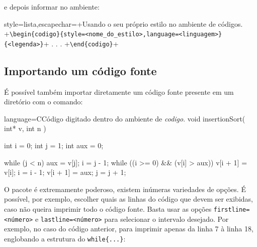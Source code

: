 \begin{center}
\colorbox{black!8}{\ttfamily{}\hspace{\linewidth}\hspace{-2\fboxsep}}
\end{center}

\noindent
e depois informar no ambiente: 

\begin{codigo}{style=lista,escapechar=+}{Usando o seu próprio estilo no ambiente de códigos.}
+\verb!\begin{codigo}{style=<nome_do_estilo>,language=<linguagem>}{<legenda>}!+
.
.
.
+\verb!\end{codigo}!+
\end{codigo}

\subsection{Importando um código fonte}

É possível também importar diretamente um código fonte presente em um diretório com o comando:

\begin{center}
\colorbox{black!8}{\ttfamily{}\hspace{\linewidth}\hspace{-2\fboxsep}}
\end{center}

\begin{codigo}{language=C}{Código digitado dentro do ambiente de \textit{codigo}.}
void insertionSort( int* v, int n )
{
  int i   = 0;
  int j   = 1;
  int aux = 0;
  
  while (j < n)
  {
    aux = v[j];
    i   = j - 1;
    while ((i >= 0) && (v[i] > aux))
    {
      v[i + 1] = v[i];
      i = i - 1;
    }
    v[i + 1] = aux;
    j = j + 1;
  }
}
\end{codigo}


O pacote  é extremamente poderoso, existem inúmeras variedades de opções. É possível, por exemplo, escolher quais as linhas do código que devem ser exibidas, caso não queira imprimir todo o código fonte. Basta usar as opções \Verb+firstline=<número>+ e \Verb+lastline=<número>+ para selecionar o intervalo desejado. Por exemplo, no caso do código anterior, para imprimir apenas da linha 7 à linha 18, englobando a estrutura do \Verb+while{...}+:

